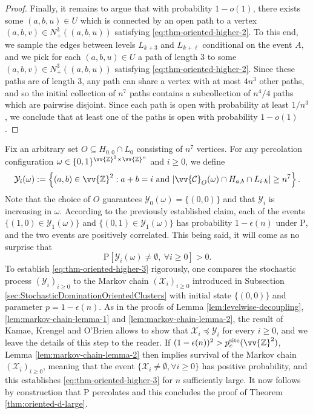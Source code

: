 \documentclass[11pt]{article}
\renewcommand{\P}{\mathrm{P}}
\newcommand{\Z}{\mathbb{Z}}
\theoremstyle{remark}
\begin{document}
\begin{proof}
    Finally, it remains to argue that with probability $1-o(1)$, there exists some $(a,b,u) \in U$ which is connected by an open path to a vertex $(a,b,v) \in N_+^3((a,b,u))$ satisfying \eqref{eq:thm-oriented-higher-2}. To this end, we sample the edges between levels $L_{k+3}$ and $L_{k+\ell}$ conditional on the event $A$, and we pick for each $(a,b,u) \in U$ a path of length $3$ to some $(a,b,v) \in N_+^3((a,b,u))$ satisfying \eqref{eq:thm-oriented-higher-2}. Since these paths are of length $3$, any path can share a vertex with at most $4n^3$ other paths, and so the initial collection of $n^7$ paths contains a subcollection of $n^4 / 4$ paths which are pairwise disjoint. 
    Since each path is open with probability at least $1/n^3$, we conclude that at least one of the paths is open with probability $1-o(1)$.
    \end{proof}



Fix an arbitrary set $O \subseteq H_{0,0} \cap L_0$ consisting of $n^7$ vertices. For any percolation configuration $\omega \in \{0,1\}^{\vv{\Z}^2 \times \vv{\Z}^n}$ and $i\ge 0$, we define 
    \begin{equation}
        \mathcal{Y}_i(\omega) := \left\{(a,b) \in \vv{\Z}^2 : a+b = i\ \text{and}\ |\vv{\mathcal{C}}_O(\omega) \cap H_{a,b} \cap L_{i \cdot h}| \geq n^7\right\}.
    \end{equation}
Note that the choice of $O$ guarantees $\mathcal{Y}_0(\omega) = \{(0,0)\}$ and that $\mathcal{Y}_i$ is increasing in $\omega$.
According to the previously established claim, each of the events $\{(1,0) \in \mathcal{Y}_1(\omega)\}$ and $\{(0,1) \in \mathcal{Y}_1(\omega)\}$ has probability $1-\epsilon(n)$ under $\P$, and the two events are positively correlated. 
This being said, it will come as no surprise that 
    \begin{equation}\label{eq:thm-oriented-higher-3}
        \P[\mathcal{Y}_i(\omega) \neq \emptyset,\ \forall i\ge 0] > 0.
    \end{equation}
To establish \eqref{eq:thm-oriented-higher-3} rigorously, one compares the stochastic process $(\mathcal{Y}_i)_{i\ge 0}$ to the Markov chain $(\mathcal{X}_i)_{i\ge 0}$ introduced in Subsection \ref{sec:StochasticDominationOrientedClusters}  with initial state $\{(0,0)\}$ and parameter $p= 1 - \epsilon(n)$. 
As in the proofs of Lemma \ref{lem:levelwise-decoupling}, \ref{lem:markov-chain-lemma-1} and \ref{lem:markov-chain-lemma-2}, the result of Kamae, Krengel and O'Brien \cite{Kamae1977} allows to show that $\mathcal{X}_i \preceq \mathcal{Y}_i$ for every $i\ge 0$, and we leave the details of this step to the reader. If $(1-\epsilon(n))^2 > p_c^{\mathrm{site}}(\vv{\Z}^2)$, Lemma \ref{lem:markov-chain-lemma-2} then implies survival of the Markov chain $(\mathcal{X}_i)_{i\ge 0}$, meaning that the event $\{\mathcal{X}_i\neq \emptyset, \forall i\ge 0\}$ has positive probability, and this establishes \eqref{eq:thm-oriented-higher-3} for $n$ sufficiently large. It now follows by construction that $\P$ percolates and this concludes the proof of Theorem \ref{thm:oriented-d-large}.
\end{document}
